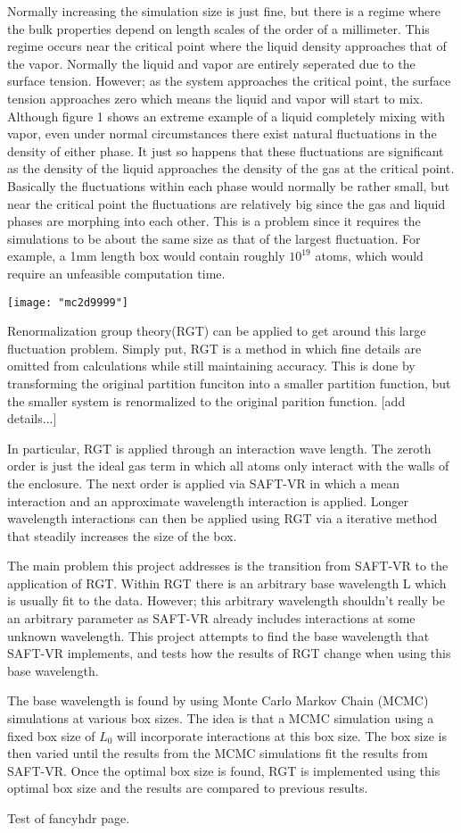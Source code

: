 Normally increasing the simulation size is just fine, but there is a regime where the bulk properties depend on length scales of the order of a millimeter. This regime occurs near the critical point where the liquid density approaches that of the vapor. Normally the liquid and vapor are entirely seperated due to the surface tension. However; as the system approaches the critical point, the surface tension approaches zero which means the liquid and vapor will start to mix. Although figure 1 shows an extreme example of a liquid completely mixing with vapor, even under normal circumstances there exist natural fluctuations in the density of either phase. It just so happens that these fluctuations are significant as the density of the liquid approaches the density of the gas at the critical point. Basically the fluctuations within each phase would normally be rather small, but near the critical point the fluctuations are relatively big since the gas and liquid phases are morphing into each other. This is a problem since it requires the simulations to be about the same size as that of the largest fluctuation. For example, a 1mm length box would contain roughly $10^{19}$ atoms, which would require an unfeasible computation time.

\texttt{[image: "mc2d9999"]}

Renormalization group theory(RGT) can be applied to get around this large fluctuation problem. Simply put, RGT is a method in which fine details are omitted from calculations while still maintaining accuracy. This is done by transforming the original partition funciton into a smaller partition function, but the smaller system is renormalized to the original parition function. [add details...]

In particular, RGT is applied through an interaction wave length. The zeroth order is just the ideal gas term in which all atoms only interact with the walls of the enclosure. The next order is applied via SAFT-VR in which a mean interaction and an approximate wavelength interaction is applied. Longer wavelength interactions can then be applied using RGT via a iterative method that steadily increases the size of the box.

The main problem this project addresses is the transition from SAFT-VR to the application of RGT. Within RGT there is an arbitrary base wavelength L which is usually fit to the data. However; this arbitrary wavelength shouldn't really be an arbitrary parameter as SAFT-VR already includes interactions at some unknown wavelength. This project attempts to find the base wavelength that SAFT-VR implements, and tests how the results of RGT change when using this base wavelength.

The base wavelength is found by using Monte Carlo Markov Chain (MCMC) simulations at various box sizes. The idea is that a MCMC simulation using a fixed box size of $L_0$ will incorporate interactions at this box size. The box size is then varied until the results from the MCMC simulations fit the results from SAFT-VR. Once the optimal box size is found, RGT is implemented using this optimal box size and the results are compared to previous results.



\newpage

Test of fancyhdr page.
